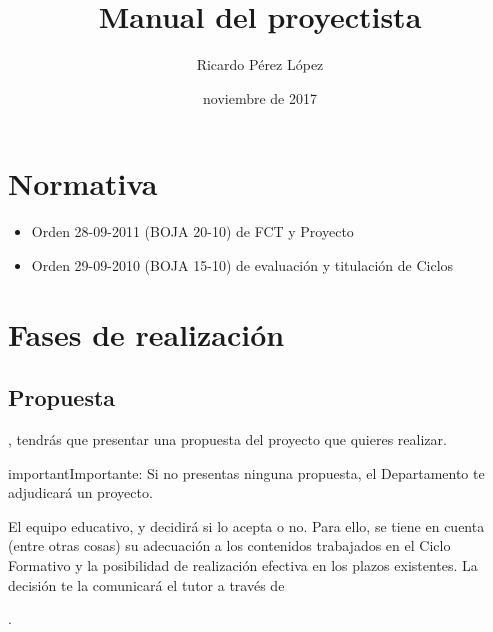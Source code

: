 \documentclass[a4paper,12pt,spanish]{sphinxmanual}
\title{Manual del proyectista}
\date{noviembre de 2017}
\author{Ricardo Pérez López}
\begin{document}
\maketitle
\sphinxtableofcontents
{}\label{\detokenize{index_latex::doc}}



\chapter{Normativa}
\label{\detokenize{normativa:manual-del-proyectista}}\label{\detokenize{normativa:normativa}}\label{\detokenize{normativa::doc}}\begin{itemize}
\item {} 
Orden 28-09-2011 (BOJA 20-10) de FCT y Proyecto

\item {} 
Orden 29-09-2010 (BOJA 15-10) de evaluación y titulación de Ciclos

\end{itemize}


\chapter{Fases de realización}
\label{\detokenize{fases-de-realizacion:fases-de-realizacion}}\label{\detokenize{fases-de-realizacion::doc}}

\section{Propuesta}
\label{\detokenize{fases-de-realizacion:propuesta}}
, tendrás
que presentar una propuesta del proyecto que quieres realizar.

\begin{sphinxadmonition}{important}{Importante:}
Si no presentas ninguna propuesta, el Departamento te adjudicará un proyecto.
\end{sphinxadmonition}

El equipo educativo,  y
decidirá si lo acepta o no. Para ello, se tiene en cuenta (entre otras cosas) su
adecuación a los contenidos trabajados en el Ciclo Formativo y la posibilidad de
realización efectiva en los plazos existentes. La decisión te la comunicará el
tutor a través de %
\begin{footnote}[1]\sphinxAtStartFootnote
{}
%
\end{footnote}.
\end{document}
